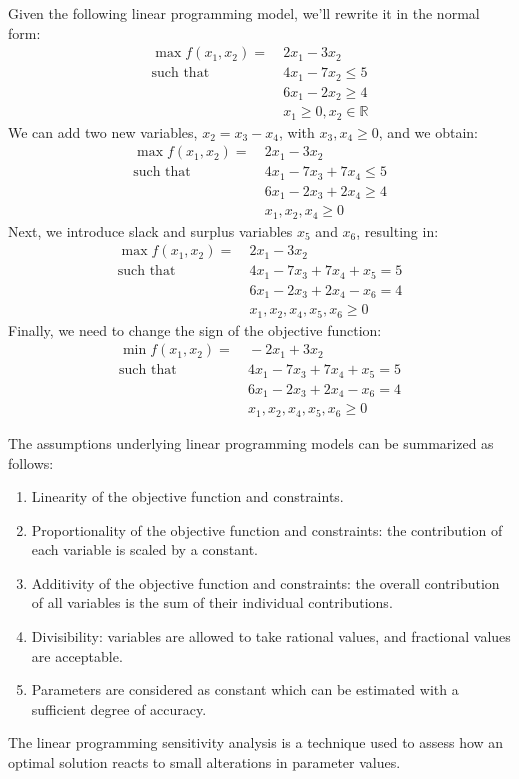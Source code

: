 \begin{example}
    Given the following linear programming model, we'll rewrite it in the normal form:
    \begin{align*}
        \max{f(x_1,x_2)}           =&\: 2x_1-3x_2          \\
        \text{such that }     &\: 4x_1-7x_2 \leq 5  \\
                                    &\: 6x_1-2x_2 \geq 4  \\
                                    &\: x_1 \geq 0, x_2 \in \mathbb{R}
    \end{align*}
    We can add two new variables, $x_2=x_3-x_4$, with $x_3,x_4 \geq 0$, and we obtain:
    \begin{align*}
        \max{f(x_1,x_2)}           =&\: 2x_1-3x_2          \\
        \text{such that }     &\: 4x_1-7x_3+7x_4 \leq 5  \\
                                    &\: 6x_1-2x_3+2x_4 \geq 4  \\
                                    &\: x_1,x_2,x_4 \geq 0
    \end{align*}
    Next, we introduce slack and surplus variables $x_5$ and $x_6$, resulting in:
    \begin{align*}
        \max{f(x_1,x_2)}           =&\: 2x_1-3x_2          \\
        \text{such that }     &\: 4x_1-7x_3+7x_4+x_5 = 5  \\
                                    &\: 6x_1-2x_3+2x_4-x_6 = 4  \\
                                    &\: x_1,x_2,x_4,x_5,x_6 \geq 0
    \end{align*}
    Finally, we need to change the sign of the objective function:
    \begin{align*}
        \min{f(x_1,x_2)}           =&\: -2x_1+3x_2          \\
        \text{such that }     &\: 4x_1-7x_3+7x_4+x_5 = 5  \\
                                    &\: 6x_1-2x_3+2x_4-x_6 = 4  \\
                                    &\: x_1,x_2,x_4,x_5,x_6 \geq 0
    \end{align*}
\end{example}
The assumptions underlying linear programming models can be summarized as follows:
\begin{enumerate}
    \item Linearity of the objective function and constraints. 
    \item Proportionality of the objective function and constraints: the contribution of each variable is scaled by a constant. 
    \item Additivity of the objective function and constraints: the overall contribution of all variables is the sum of their individual contributions.
    \item Divisibility: variables are allowed to take rational values, and fractional values are acceptable.
    \item Parameters are considered as constant which can be estimated with a sufficient degree of accuracy. 
\end{enumerate}
The linear programming sensitivity analysis is a technique used to assess how an optimal solution reacts to small alterations in parameter values.
